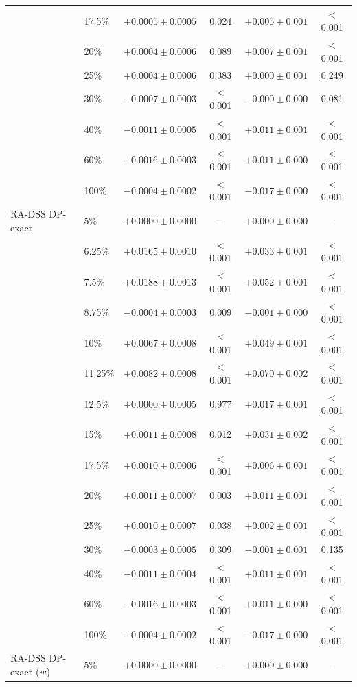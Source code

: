 \begin{tabular}{llcccc}
 & 17.5\% & $+0.0005\pm0.0005$ & 0.024 & $+0.005\pm0.001$ & $<$0.001 \\
 & 20\% & $+0.0004\pm0.0006$ & 0.089 & $+0.007\pm0.001$ & $<$0.001 \\
 & 25\% & $+0.0004\pm0.0006$ & 0.383 & $+0.000\pm0.001$ & 0.249 \\
 & 30\% & $-0.0007\pm0.0003$ & $<$0.001 & $-0.000\pm0.000$ & 0.081 \\
 & 40\% & $-0.0011\pm0.0005$ & $<$0.001 & $+0.011\pm0.001$ & $<$0.001 \\
 & 60\% & $-0.0016\pm0.0003$ & $<$0.001 & $+0.011\pm0.000$ & $<$0.001 \\
 & 100\% & $-0.0004\pm0.0002$ & $<$0.001 & $-0.017\pm0.000$ & $<$0.001 \\
\midrule
RA-DSS DP-exact & 5\% & $+0.0000\pm0.0000$ & -- & $+0.000\pm0.000$ & -- \\
 & 6.25\% & $+0.0165\pm0.0010$ & $<$0.001 & $+0.033\pm0.001$ & $<$0.001 \\
 & 7.5\% & $+0.0188\pm0.0013$ & $<$0.001 & $+0.052\pm0.001$ & $<$0.001 \\
 & 8.75\% & $-0.0004\pm0.0003$ & 0.009 & $-0.001\pm0.000$ & $<$0.001 \\
 & 10\% & $+0.0067\pm0.0008$ & $<$0.001 & $+0.049\pm0.001$ & $<$0.001 \\
 & 11.25\% & $+0.0082\pm0.0008$ & $<$0.001 & $+0.070\pm0.002$ & $<$0.001 \\
 & 12.5\% & $+0.0000\pm0.0005$ & 0.977 & $+0.017\pm0.001$ & $<$0.001 \\
 & 15\% & $+0.0011\pm0.0008$ & 0.012 & $+0.031\pm0.002$ & $<$0.001 \\
 & 17.5\% & $+0.0010\pm0.0006$ & $<$0.001 & $+0.006\pm0.001$ & $<$0.001 \\
 & 20\% & $+0.0011\pm0.0007$ & 0.003 & $+0.011\pm0.001$ & $<$0.001 \\
 & 25\% & $+0.0010\pm0.0007$ & 0.038 & $+0.002\pm0.001$ & $<$0.001 \\
 & 30\% & $-0.0003\pm0.0005$ & 0.309 & $-0.001\pm0.001$ & 0.135 \\
 & 40\% & $-0.0011\pm0.0004$ & $<$0.001 & $+0.011\pm0.001$ & $<$0.001 \\
 & 60\% & $-0.0016\pm0.0003$ & $<$0.001 & $+0.011\pm0.000$ & $<$0.001 \\
 & 100\% & $-0.0004\pm0.0002$ & $<$0.001 & $-0.017\pm0.000$ & $<$0.001 \\
\midrule
RA-DSS DP-exact ($w$) & 5\% & $+0.0000\pm0.0000$ & -- & $+0.000\pm0.000$ & -- \\

\end{tabular}
